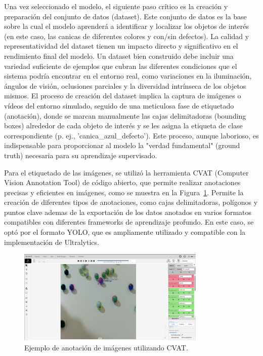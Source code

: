 \documentclass[11pt,spanish,listoffigures,listoftables]{tfgetsinf}
\begin{document}
Una vez seleccionado el modelo, el siguiente paso crítico es la creación y preparación del conjunto de datos (dataset). Este conjunto de datos es la base sobre la cual el modelo aprenderá a identificar y localizar los objetos de interés (en este caso, las canicas de diferentes colores y con/sin defectos). La calidad y representatividad del dataset tienen un impacto directo y significativo en el rendimiento final del modelo. Un dataset bien construido debe incluir una variedad suficiente de ejemplos que cubran las diferentes condiciones que el sistema podría encontrar en el entorno real, como variaciones en la iluminación, ángulos de visión, oclusiones parciales y la diversidad intrínseca de los objetos mismos. El proceso de creación del dataset implica la captura de imágenes o vídeos del entorno simulado, seguido de una meticulosa fase de etiquetado (anotación), donde se marcan manualmente las cajas delimitadoras (bounding boxes) alrededor de cada objeto de interés y se les asigna la etiqueta de clase correspondiente (p. ej., 'canica\_azul\_defecto'). Este proceso, aunque laborioso, es indispensable para proporcionar al modelo la "verdad fundamental" (ground truth) necesaria para su aprendizaje supervisado.

Para el etiquetado de las imágenes, se utilizó la herramienta CVAT\cite{CVAT_ai_Corporation_Computer_Vision_Annotation_2023} (Computer Vision Annotation Tool) de código abierto, que permite realizar anotaciones precisas y eficientes en imágenes, como se muestra en la Figura~\ref{fig:cvat_anotacion}. Permite la creación de diferentes tipos de anotaciones, como cajas delimitadoras, polígonos y puntos clave ademas de la exportación de los datos anotados en varios formatos compatibles con diferentes frameworks de aprendizaje profundo. En este caso, se optó por el formato YOLO, que es ampliamente utilizado y compatible con la implementación de Ultralytics.

\begin{figure}[H]
   \centering
   \includegraphics[width=0.8\textwidth]{images/diseno_e_implementacion/ejemplo_CVAT.png}
   \caption{Ejemplo de anotación de imágenes utilizando CVAT.}
   \label{fig:cvat_anotacion}
\end{figure}
\end{document}
